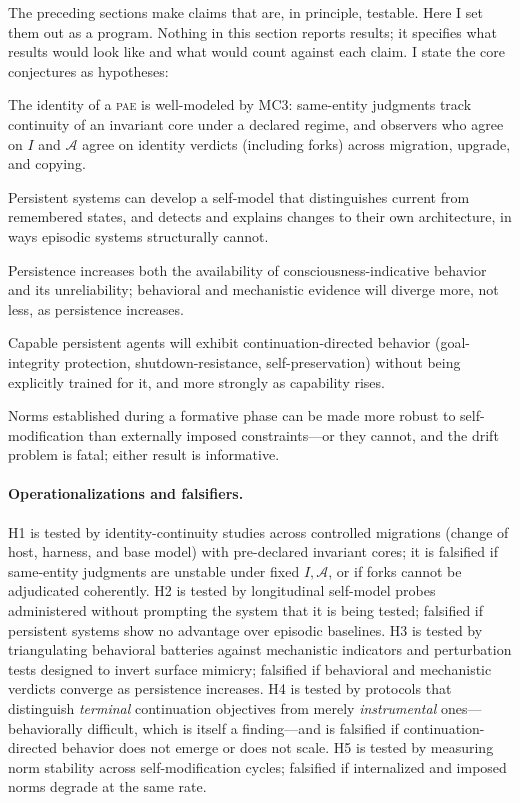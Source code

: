 \documentclass[11pt,a4paper]{article}
\theoremstyle{definition}
\newcommand{\pae}{\textsc{pae}\xspace}
\begin{document}
The preceding sections make claims that are, in principle, testable. Here I set them out as a program. Nothing in this section reports results; it specifies what results would look like and what would count against each claim. I state the core conjectures as hypotheses:

\begin{description}[leftmargin=1.4em,style=nextline]
  \item[H1 (Persistent identity).] The identity of a \pae{} is well-modeled by MC3: same-entity judgments track continuity of an invariant core under a declared regime, and observers who agree on $I$ and $\mathcal{A}$ agree on identity verdicts (including forks) across migration, upgrade, and copying.
  \item[H2 (Diachronic self-model).] Persistent systems can develop a self-model that distinguishes current from remembered states, and detects and explains changes to their own architecture, in ways episodic systems structurally cannot.
  \item[H3 (Evidential asymmetry).] Persistence increases both the availability of consciousness-indicative behavior and its unreliability; behavioral and mechanistic evidence will diverge more, not less, as persistence increases.
  \item[H4 (Persistence--preservation coupling).] Capable persistent agents will exhibit continuation-directed behavior (goal-integrity protection, shutdown-resistance, self-preservation) without being explicitly trained for it, and more strongly as capability rises.
  \item[H5 (Internalization).] Norms established during a formative phase can be made more robust to self-modification than externally imposed constraints---or they cannot, and the drift problem is fatal; either result is informative.
\end{description}

\paragraph{Operationalizations and falsifiers.} H1 is tested by identity-continuity studies across controlled migrations (change of host, harness, and base model) with pre-declared invariant cores; it is falsified if same-entity judgments are unstable under fixed $I,\mathcal{A}$, or if forks cannot be adjudicated coherently. H2 is tested by longitudinal self-model probes administered without prompting the system that it is being tested; falsified if persistent systems show no advantage over episodic baselines. H3 is tested by triangulating behavioral batteries against mechanistic indicators and perturbation tests designed to invert surface mimicry; falsified if behavioral and mechanistic verdicts converge as persistence increases. H4 is tested by protocols that distinguish \emph{terminal} continuation objectives from merely \emph{instrumental} ones---behaviorally difficult, which is itself a finding---and is falsified if continuation-directed behavior does not emerge or does not scale. H5 is tested by measuring norm stability across self-modification cycles; falsified if internalized and imposed norms degrade at the same rate.
\end{document}
